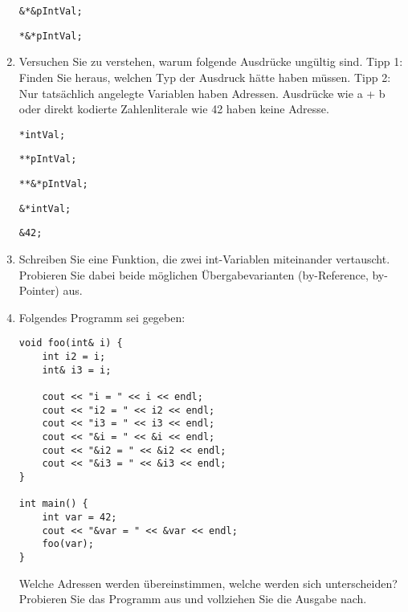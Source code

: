 \documentclass[
  accentcolor=tud1c,	%
  colorbacktitle,		%
  inverttitle,			%
  german,				%
  twoside
]{tudexercise}
\begin{document}
\begin{enumerate}
\begin{lstlisting}
&*&pIntVal;
\end{lstlisting}

\begin{lstlisting}
*&*pIntVal;
\end{lstlisting}


\item Versuchen Sie zu verstehen, warum folgende Ausdrücke ungültig sind. Tipp 1: Finden Sie heraus, welchen Typ der Ausdruck hätte haben müssen. Tipp 2: Nur tatsächlich angelegte Variablen haben Adressen. Ausdrücke wie a + b oder direkt kodierte Zahlenliterale wie 42 haben keine Adresse.

\begin{lstlisting}
*intVal;
\end{lstlisting}

\begin{lstlisting}
**pIntVal;
\end{lstlisting}

\begin{lstlisting}
**&*pIntVal;
\end{lstlisting}

\begin{lstlisting}
&*intVal;
\end{lstlisting}

\begin{lstlisting}
&42;
\end{lstlisting}

\item Schreiben Sie eine Funktion, die zwei int-Variablen miteinander vertauscht. Probieren Sie dabei beide möglichen Übergabevarianten (by-Reference, by-Pointer) aus. 

\item Folgendes Programm sei gegeben:\\

\begin{minipage}{\textwidth}
\begin{lstlisting}
void foo(int& i) {
	int i2 = i;
	int& i3 = i;
	
	cout << "i = " << i << endl;
	cout << "i2 = " << i2 << endl;
	cout << "i3 = " << i3 << endl;
	cout << "&i = " << &i << endl;
	cout << "&i2 = " << &i2 << endl;
	cout << "&i3 = " << &i3 << endl;
}

int main() {
	int var = 42;
	cout << "&var = " << &var << endl;
	foo(var);
}
\end{lstlisting}
\end{minipage}

Welche Adressen werden übereinstimmen, welche werden sich unterscheiden? Probieren Sie das Programm aus und vollziehen Sie die Ausgabe nach.

\end{enumerate}
\end{document}

